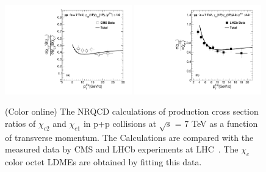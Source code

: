 \documentclass[12pt,a4paper,final]{iopart}
\begin{document}
\begin{figure}
\includegraphics[width=0.49\textwidth]{Fig2a_Chic2Chic1_CMS_Fit.pdf}
\includegraphics[width=0.49\textwidth]{Fig2b_Chic2Chic1_LHCb_Fit.pdf}
\caption{(Color online) The NRQCD calculations of production cross section ratios 
of  $\chi_{c2}$ and $\chi_{c1}$ in p+p collisions at
$\sqrt{s}$ = 7 TeV as a function of transverse momentum. 
The Calculations are compared with the measured data by
CMS and LHCb experiments at LHC~\cite{Chatrchyan:2012ub,Aaij:2013dja}. The $\chi_{c}$
color octet LDMEs are obtained by fitting this data. 
}
\label{Fig:LDMEChicCMS_LHCb}
\end{figure}
\end{document}
